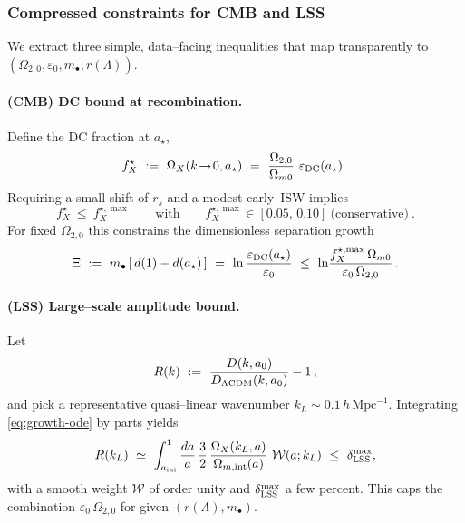 \documentclass[10pt]{article}
\theoremstyle{definition}
\theoremstyle{plain}
\begin{document}
\subsubsection*{Compressed constraints for CMB and LSS}\label{subsubsec:uom-main-018}

We extract three simple, data–facing inequalities that map transparently to $(\Omega_{2,0},\varepsilon_0,m_\bullet,r(\Lambda))$.

\paragraph{(CMB) DC bound at recombination.}\label{par:uom-main-175}
Define the DC fraction at $a_\star$,
\begin{equation}\label{eq:fXstar}
f_X^\star\ :=\ \Omega_X(k\!\to\!0,a_\star)
\ =\ \frac{\Omega_{2,0}}{\Omega_{m0}}\ \varepsilon_{\rm DC}(a_\star)\,.
\end{equation}
Requiring a small shift of $r_s$ and a modest early–ISW implies
\begin{equation}\label{eq:cmb-bound}
\boxed{\qquad f_X^\star\ \le\ f_X^{\star,\max}\qquad \text{with}\qquad f_X^{\star,\max}\in[0.05,\,0.10]\ \text{(conservative)}\ .\qquad}
\end{equation}
For fixed $\Omega_{2,0}$ this constrains the dimensionless separation growth
\begin{equation}\label{eq:Xi-def}
\Xi\ :=\ m_\bullet\,[\,d(1)-d(a_\star)\,]\ =\ \ln\frac{\varepsilon_{\rm DC}(a_\star)}{\varepsilon_0}\ 
\le\ \ln\!\frac{f_X^{\star,\max}\,\Omega_{m0}}{\varepsilon_0\,\Omega_{2,0}}\,.
\end{equation}

\paragraph{(LSS) Large–scale amplitude bound.}\label{par:uom-main-176}
Let
\begin{equation}\label{eq:R-def}
R(k)\ :=\ \frac{D(k,a_0)}{D_{\Lambda{\rm CDM}}(k,a_0)}-1\,,
\end{equation}
and pick a representative quasi–linear wavenumber $k_L\sim 0.1\,h\,\mathrm{Mpc}^{-1}$. Integrating \eqref{eq:growth-ode} by parts yields
\begin{equation}\label{eq:R-ineq}
R(k_L)\ \simeq\ \int_{a_{\rm ini}}^{1}\frac{da}{a}\,\frac{3}{2}\,
\frac{\Omega_X(k_L,a)}{\Omega_{m,\mathrm{int}}(a)}\ \mathcal W(a;k_L)\ \le\ \delta_{\rm LSS}^{\max},
\end{equation}
with a smooth weight $\mathcal W$ of order unity and $\delta_{\rm LSS}^{\max}$ a few percent. This caps the combination
$\varepsilon_0\,\Omega_{2,0}$ for given $(r(\Lambda),m_\bullet)$.
\end{document}
